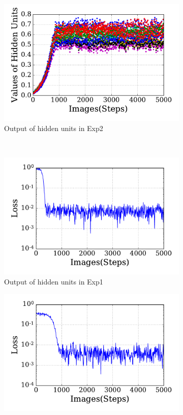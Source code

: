 \begin{figure}
\begin{subfigure}[t]{0.4\textwidth}
		\includegraphics[width=\textwidth]{pics_sdlm/31_exp_RBM_noise/exp2_hid_s.pdf}
		\caption{Output of hidden units in Exp2}
	\end{subfigure}\\
	\begin{subfigure}[t]{0.4\textwidth}
		\includegraphics[width=\textwidth]{pics_sdlm/31_exp_RBM_noise/exp1_loss_s.pdf}
		\caption{Output of hidden units in Exp1}
	\end{subfigure}
	\begin{subfigure}[t]{0.4\textwidth}
		\includegraphics[width=\textwidth]{pics_sdlm/31_exp_RBM_noise/exp2_loss_s.pdf}

\end{subfigure}
\end{figure}

